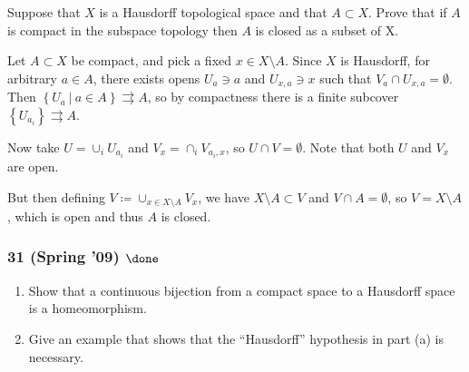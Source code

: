 \begin{problem}[?]

Suppose that \(X\) is a Hausdorff topological space and that
\(A \subset X\). Prove that if \(A\) is compact in the subspace topology
then \(A\) is closed as a subset of X.

\end{problem}

\begin{solution}

\envlist

\begin{concept}

\envlist

\end{concept}

Let \(A \subset X\) be compact, and pick a fixed \(x\in X\setminus A\).
Since \(X\) is Hausdorff, for arbitrary \(a\in A\), there exists opens
\(U_{a} \ni a\) and \(U_{x,a}\ni x\) such that
\(V_{a} \cap U_{x,a} = \emptyset\). Then
\(\left\{{U_{a} {~\mathrel{\Big|}~}a\in A}\right\} \rightrightarrows A\),
so by compactness there is a finite subcover
\(\left\{{U_{a_i}}\right\} \rightrightarrows A\).

Now take \(U = \cup_i U_{a_i}\) and \(V_x = \cap_i V_{a_i, x}\), so
\(U\cap V = \emptyset\). Note that both \(U\) and \(V_x\) are open.

But then defining \(V \coloneqq\cup_{x\in X\setminus A} V_x\), we have
\(X\setminus A \subset V\) and \(V\cap A = \emptyset\), so
\(V = X\setminus A\), which is open and thus \(A\) is closed.

\end{solution}

\hypertarget{spring-09-done}{%
\subsubsection{\texorpdfstring{31 (Spring '09)
\(\done\)}{31 (Spring '09) \textbackslash done}}\label{spring-09-done}}

\begin{problem}[Spring 2009, 31]

\envlist

\begin{enumerate}
\def\labelenumi{\alph{enumi}.}
\item
  Show that a continuous bijection from a compact space to a Hausdorff
  space is a homeomorphism.
\item
  Give an example that shows that the ``Hausdorff'' hypothesis in part
  (a) is necessary.
\end{enumerate}

\end{problem}

